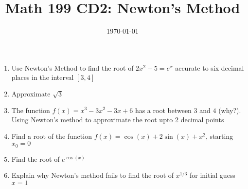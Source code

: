 \documentclass[12pt]{article}
\title{Math 199 CD2: Newton's Method}
\date{\today}
\begin{document}
	
	\maketitle
	
	
	
	\begin{enumerate}
		\item Use Newton’s Method to find the root of $2x^2+5 =e^x$ accurate to six decimal places in the interval $[3,4]$
		\vskip 5cm
		\item Approximate $\sqrt{3}$
		\vskip5cm 
		\item The function $f(x)=x^3 - 3x^2 - 3x+6$ has a root between $3$ and $4$ (why?). Using Newton's method to approximate the root upto 2 decimal points
		\newpage
		\item Find a root of the function $f(x) = \cos(x) + 2\sin(x) + x^2$, starting $x_0=0$
		\vskip 5cm
		\item Find the root of $e^{\cos(x)}$
		\vskip 5cm 
		\item Explain why Newton's method fails to find the root of $x^{1/3}$ for initial guess $x=1$
	\end{enumerate}
	
\end{document}
